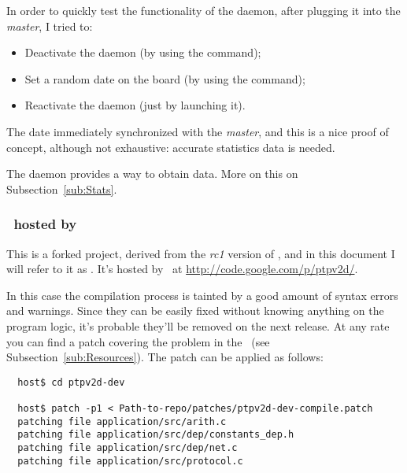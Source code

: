         In order to quickly test the functionality of the daemon, after
        plugging it into the \emph{master}, I tried to:
        \begin{itemize}
        \item   Deactivate the daemon (by using the 
                command);
        \item   Set a random date on the board (by using the 
                command);
        \item   Reactivate the daemon (just by launching it).
        \end{itemize}
        The date immediately synchronized with the \emph{master}, and this
        is a nice proof of concept, although not exhaustive: accurate
        statistics data is needed.

        The daemon provides a way to obtain data. More on this on
        Subsection~\ref{sub:Stats}.


    \subsubsection{ \PTPd\ hosted by \GoogleCode } \label{subsub:PTPdV2}

        This is a forked project, derived from the \emph{rc1} version of
        \PTPd, and in this document I will refer to it as \PTPdGC. It's
        hosted by \GoogleCode\ at \url{http://code.google.com/p/ptpv2d/}.

        In this case the compilation process is tainted by a good amount
        of syntax errors and warnings. Since they can be easily fixed
        without knowing anything on the program logic, it's probable
        they'll be removed on the next release. At any rate you can find a
        patch covering the problem in the \MyRepo\ (see
        Subsection~\ref{sub:Resources}). The patch can be applied as
        follows:
\begin{lstlisting}
  host$ cd ptpv2d-dev

  host$ patch -p1 < Path-to-repo/patches/ptpv2d-dev-compile.patch
  patching file application/src/arith.c
  patching file application/src/dep/constants_dep.h
  patching file application/src/dep/net.c
  patching file application/src/protocol.c
\end{lstlisting}

